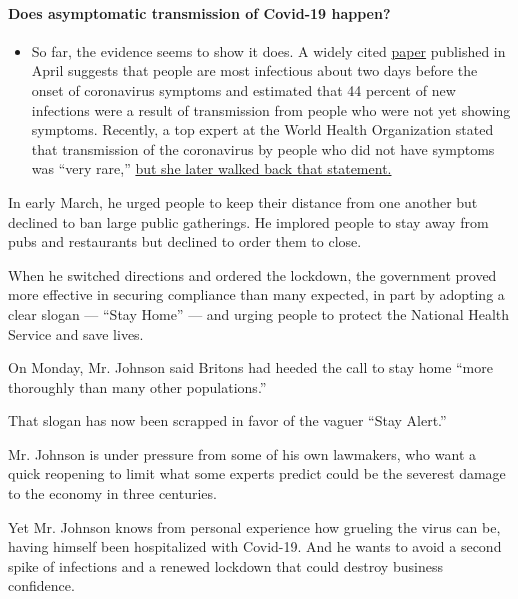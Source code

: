 \begin{itemize}
{  \paragraph{Does asymptomatic transmission of Covid-19
  happen?}\label{does-asymptomatic-transmission-of-covid-19-happen}}

  \begin{itemize}
  \tightlist
  \item
    So far, the evidence seems to show it does. A widely cited
    \href{https://www.nature.com/articles/s41591-020-0869-5}{paper}
    published in April suggests that people are most infectious about
    two days before the onset of coronavirus symptoms and estimated that
    44 percent of new infections were a result of transmission from
    people who were not yet showing symptoms. Recently, a top expert at
    the World Health Organization stated that transmission of the
    coronavirus by people who did not have symptoms was ``very rare,''
    \href{https://www.nytimes.com/2020/06/09/world/coronavirus-updates.html?action=click\&pgtype=Article\&state=default\&region=MAIN_CONTENT_3\&context=storylines_faq\#link-1f302e21}{but
    she later walked back that statement.}
  \end{itemize}
\end{itemize}

In early March, he urged people to keep their distance from one another
but declined to ban large public gatherings. He implored people to stay
away from pubs and restaurants but declined to order them to close.

When he switched directions and ordered the lockdown, the government
proved more effective in securing compliance than many expected, in part
by adopting a clear slogan --- ``Stay Home'' --- and urging people to
protect the National Health Service and save lives.

On Monday, Mr. Johnson said Britons had heeded the call to stay home
``more thoroughly than many other populations.''

That slogan has now been scrapped in favor of the vaguer ``Stay Alert.''

Mr. Johnson is under pressure from some of his own lawmakers, who want a
quick reopening to limit what some experts predict could be the severest
damage to the economy in three centuries.

Yet Mr. Johnson knows from personal experience how grueling the virus
can be, having himself been hospitalized with Covid-19. And he wants to
avoid a second spike of infections and a renewed lockdown that could
destroy business confidence.

